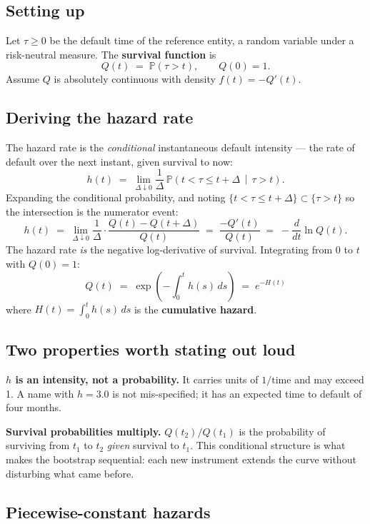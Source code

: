 \documentclass[11pt,a4paper]{article}
\begin{document}
\subsection{Setting up}

Let $\tau \ge 0$ be the default time of the reference entity, a random variable under a
risk-neutral measure. The \textbf{survival function} is
\[
Q(t) \;=\; \mathbb{P}(\tau > t), \qquad Q(0) = 1 .
\]
Assume $Q$ is absolutely continuous with density $f(t) = -Q'(t)$.

\subsection{Deriving the hazard rate}

The hazard rate is the \emph{conditional} instantaneous default intensity --- the rate of
default over the next instant, given survival to now:
\[
h(t) \;=\; \lim_{\Delta \downarrow 0}
\frac{1}{\Delta}\,\mathbb{P}\!\left(t < \tau \le t+\Delta \,\middle|\, \tau > t\right).
\]
Expanding the conditional probability, and noting
$\{t < \tau \le t+\Delta\} \subset \{\tau > t\}$ so the intersection is the numerator event:
\[
h(t) \;=\; \lim_{\Delta \downarrow 0} \frac{1}{\Delta}
\cdot \frac{Q(t) - Q(t+\Delta)}{Q(t)}
\;=\; \frac{-Q'(t)}{Q(t)}
\;=\; -\frac{d}{dt}\ln Q(t).
\]
The hazard rate \emph{is} the negative log-derivative of survival. Integrating from $0$ to
$t$ with $Q(0) = 1$:
\begin{equation}
\boxed{\;Q(t) \;=\; \exp\!\left(-\int_0^t h(s)\,ds\right) \;=\; e^{-H(t)}\;}
\end{equation}
where $H(t) = \int_0^t h(s)\,ds$ is the \textbf{cumulative hazard}.

\subsection{Two properties worth stating out loud}

\textbf{$h$ is an intensity, not a probability.} It carries units of $1/\text{time}$ and may
exceed 1. A name with $h = 3.0$ is not mis-specified; it has an expected time to default of
four months.

\textbf{Survival probabilities multiply.} $Q(t_2)/Q(t_1)$ is the probability of surviving
from $t_1$ to $t_2$ \emph{given} survival to $t_1$. This conditional structure is what makes
the bootstrap sequential: each new instrument extends the curve without disturbing what came
before.

\subsection{Piecewise-constant hazards}
\end{document}
